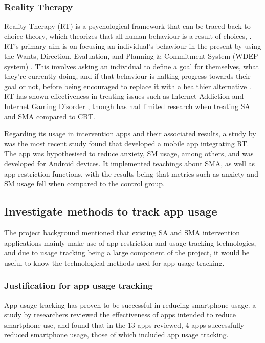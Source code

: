 \documentclass[12pt]{article}
\begin{document}
\subsubsection{Reality Therapy}
Reality Therapy (RT) is a psychological framework that can be traced back to choice theory, which theorizes that 
all human behaviour is a result
of choices, \autocite{RefWorks:RefID:143-bradley2014choice, RefWorks:RefID:145-wubbolding2016reality}. RT's primary aim is on
focusing an individual's behaviour in the present by using the Wants, Direction, Evaluation, and Planning \& 
Commitment System (WDEP system) \autocite{RefWorks:RefID:143-bradley2014choice}. This involves asking an individual
to define a goal for themselves, what they're currently doing, and if that 
behaviour is halting progress towards their goal or not, before being encouraged to replace it with a
healthier alternative \autocite{RefWorks:RefID:48-yao2017combined}. RT has shown effectiveness in treating issues
such as Internet Addiction and Internet Gaming Disorder 
\autocite{RefWorks:RefID:48-yao2017combined,RefWorks:RefID:49-zajac2017treatments}, though has had limited research
\autocite{RefWorks:RefID:143-bradley2014choice} when treating SA and SMA compared to CBT. \newline

Regarding its usage in intervention apps and their associated results, a study by 
\textcite{RefWorks:RefID:42-esmaeili2018method} was the most recent study found that developed a mobile app 
integrating RT. The app was hypothesised to reduce anxiety, SM usage, among others, and was developed for Android 
devices. It implemented teachings about SMA, as well as app restriction functions, with the results being that 
metrics such as anxiety and SM usage fell when compared to the control group.


\subsection{Investigate methods to track app usage}
The project background mentioned that existing SA and SMA intervention applications mainly make use of 
app-restriction and usage tracking technologies, and due to usage tracking being a large component of the project, 
it would be useful to know the technological methods used for app usage tracking.

\subsubsection{Justification for app usage tracking}
App usage tracking has proven to be successful in reducing smartphone usage. a
study by researchers \textcite{RefWorks:RefID:125-rahmillah2023evaluating} reviewed the effectiveness of apps 
intended to reduce smartphone use, and found that in the 13 apps reviewed, 4 apps successfully reduced smartphone 
usage, those of which included app usage tracking.
\end{document}
